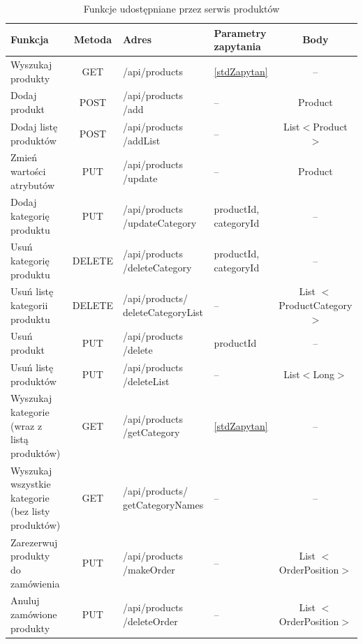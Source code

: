\documentclass[11pt,a4paper,twoside]{article}
\begin{document}
\begin{table}[htp]
\caption{Funkcje udostępniane przez serwis produktów}
\label{funkcjeProductWebservice}
\centering
\begin{tabularx}{\textwidth}{|X|c|X|X|c|}
\hline
 Funkcja & Metoda & Adres & Parametry zapytania & Body \\\hline
 Wyszukaj produkty & GET & /api/products & \ref{stdZapytan} & -- \\\hline
 Dodaj produkt & POST & /api/products /add & -- & Product \\\hline
 Dodaj listę produktów & POST & /api/products /addList & -- & List$<$Product$>$ \\\hline
 Zmień wartości atrybutów & PUT & /api/products /update & -- & Product \\\hline
 Dodaj kategorię produktu & PUT & /api/products /updateCategory & productId, categoryId & -- \\\hline
 Usuń kategorię produktu & DELETE & /api/products /deleteCategory & productId, categoryId & -- \\\hline
 Usuń listę kategorii produktu & DELETE & /api/products/ deleteCategoryList & -- & \makecell{List \\ $<$ProductCategory$>$} \\\hline
 Usuń produkt & PUT & /api/products /delete & productId & -- \\\hline
 Usuń listę produktów & PUT & /api/products /deleteList & -- & List$<$Long$>$ \\\hline
 Wyszukaj kategorie (wraz z listą produktów) & GET & /api/products /getCategory & \ref{stdZapytan} & -- \\\hline
 Wyszukaj wszystkie kategorie (bez listy produktów) & GET & /api/products/ getCategoryNames & -- & -- \\\hline
 Zarezerwuj produkty do zamówienia & PUT & /api/products /makeOrder & -- & \makecell{List \\ $<$OrderPosition$>$} \\\hline
 Anuluj zamówione produkty & PUT & /api/products /deleteOrder & -- & \makecell{List \\ $<$OrderPosition$>$} \\\hline
\end{tabularx}
\end{table}
\end{document}
